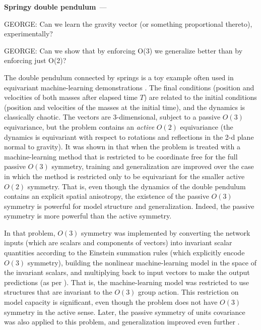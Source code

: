 \documentclass[11pt]{article}
\renewcommand{\paragraph}[1]{\medskip\par\noindent\textbf{#1}~---}
\begin{document}
\paragraph{Springy double pendulum}

GEORGE: Can we learn the gravity vector (or something proportional thereto), experimentally?

GEORGE: Can we show that by enforcing O(3) we generalize better than by enforcing just O(2)?

The double pendulum connected by springs is a toy example often used in equivariant machine-learning demonstrations \cite{finzi2021practical,yao2021simple}. 
The final conditions (position and velocities of both masses after elapsed time $T$) are related to the initial conditions (position and velocities of the masses at the initial time), and the dynamics is classically chaotic.
The vectors are 3-dimensional, subject to a passive $O(3)$ equivariance, but the problem contains an \emph{active} $O(2)$ equivariance (the dynamics is equivariant with respect to rotations and reflections in the 2-d plane normal to gravity).
It was shown in \cite{yao2021simple} that when the problem is treated with a machine-learning method that is restricted to be coordinate free for the full passive $O(3)$ symmetry, training and generalization are improved over the case in which the method is restricted only to be equivariant for the smaller active $O(2)$ symmetry.
That is, even though the dynamics of the double pendulum contains an explicit spatial anisotropy, the existence of the passive $O(3)$ symmetry is powerful for model structure and generalization.
Indeed, the passive symmetry is more powerful than the active symmetry.

In that problem, $O(3)$ symmetry was implemented by converting the network inputs (which are scalars and components of vectors) into invariant scalar quantities according to the Einstein summation rules (which explicitly encode $O(3)$ symmetry), building the nonlinear machine-learning model in the space of the invariant scalars, and multiplying back to input vectors to make the output predictions (as per \cite{villar2021scalars}).
That is, the machine-learning model was restricted to use structures that are invariant to the $O(3)$ group action.
This restriction on model capacity is significant, even though the problem does not have $O(3)$ symmetry in the active sense.
Later, the passive symmetry of units covariance was also applied to this problem, and generalization improved even further \cite{villar2022dimensionless}.
\end{document}
